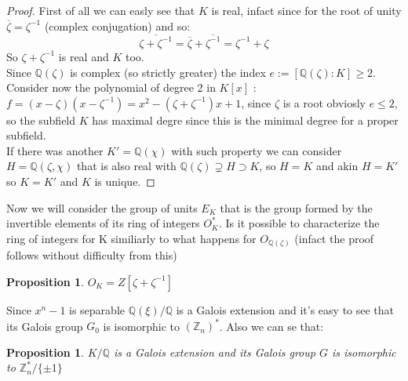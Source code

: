 \documentclass[]{article}
\theoremstyle{plain}
\newtheorem{prop}[teo]{Proposition}
\theoremstyle{remark}
\theoremstyle{definition}
\newcommand{\Z}{\mathbb{Z}}
\newcommand{\Q}{\mathbb{Q}}
\begin{document}
	
	\begin{proof}
		First of all we can easly see that $ K $ is real, infact since for the root of unity $ \overline{\zeta} = \zeta ^{-1} $ (complex conjugation) and so:
		\begin{equation*}
		\overline{ \zeta + \zeta^{-1} }= \overline{ \zeta} + \overline{\zeta^{-1} } = \zeta ^{-1}  + \zeta
		\end{equation*}
		So $ \zeta + \zeta ^{-1} $ is real and $ K $ too.\\
		Since $ \Q (\zeta) $ is complex (so strictly greater) the index $ e := [\Q (\zeta)  : K] \geq 2 $. \\
		Consider now the polynomial of degree 2 in $ K[x] $ : $ f = (x-\zeta)(x- \zeta^{-1}) = x^2 - (\zeta + \zeta ^{-1})x +1  $, since $\zeta$ is a root obviosly $ e \leq 2 $, so the subfield $ K $ has maximal degre since this is the minimal degree for a proper subfield. \\
		If there was another $ K' = \Q ( \chi ) $ with such property we can consider $ H = \Q (\zeta, \chi) $ that is also real with $ \Q (\zeta) \supsetneq H \supset K $, so $ H=K $ and akin $ H = K' $ so $ K = K' $ and $ K $ is unique.
	\end{proof}
	
	Now we will consider the group of units $ E_K$ that is the group formed by the invertible elements of its ring of integers $ O_K^\ast $. Is it possible to characterize the ring of integers for K \cite[Proposition~2.16]{CF} similiarly to what happens for $ O_{\Q (\zeta)} $ (infact the proof follows without difficulty from this)
	
	
	\begin{prop}
		$ O_K = Z[\zeta + \zeta ^{-1}] $
	\end{prop}
	
	
	Since $ x^n - 1 $ is separable $ \Q (\xi)  / \Q $ is a Galois extension and it's easy to see that its Galois group $ G_0  $ is isomorphic to $ ( \Z_{n} )^\ast $. Also we can se that:
	
	\begin{prop}
		$ K / \Q $ is a Galois extension and its Galois group $ G $ is isomorphic to $ \Z_{n}^*/ \{\pm 1\} $
	\end{prop}
	
\end{document}
